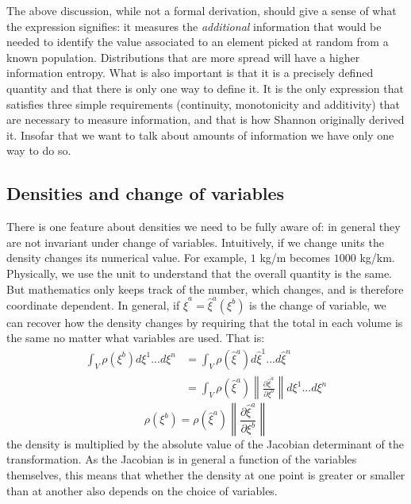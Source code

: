 \documentclass[11pt]{elsarticle}
\begin{document}
The above discussion, while not a formal derivation, should give a sense of what the expression signifies: it measures the \emph{additional} information that would be needed to identify the value associated to an element picked at random from a known population. Distributions that are more spread will have a higher information entropy. What is also important is that it is a precisely defined quantity and that there is only one way to define it. It is the only expression that satisfies three simple requirements (continuity, monotonicity and additivity) that are necessary to measure information, and that is how Shannon originally derived it. Insofar that we want to talk about amounts of information we have only one way to do so.

\subsection*{Densities and change of variables}

There is one feature about densities we need to be fully aware of: in general they are not invariant under change of variables. Intuitively, if we change units the density changes its numerical value. For example, $1$ kg/m becomes $1000$ kg/km. Physically, we use the unit to understand that the overall quantity is the same. But mathematics only keeps track of the number, which changes, and is therefore coordinate dependent. In general, if $\hat{\xi}^a=\hat{\xi}^a(\xi^b)$ is the change of variable, we can recover how the density changes by requiring that the total in each volume is the same no matter what variables are used. That is:
\begin{align*}
\int_V \rho(\xi^b) d\xi^1 ... d\xi^n &= \int_V \rho(\hat{\xi}^a) d\hat{\xi}^1 ... d\hat{\xi}^n \\
&=\int_V\rho(\hat{\xi}^a) \left\|\frac{\partial \hat{\xi}^a}{\partial \xi^b}\right\| d\xi^1 ... d\xi^n
\end{align*}
\begin{equation}\label{density_transformation}
\rho(\xi^b) = \rho(\hat{\xi}^a) \left\|\frac{\partial \hat{\xi}^a}{\partial \xi^b}\right\|
\end{equation}
the density is multiplied by the absolute value of the Jacobian determinant of the transformation. As the Jacobian is in general a function of the variables themselves, this means that whether the density at one point is greater or smaller than at another also depends on the choice of variables.
\end{document}
